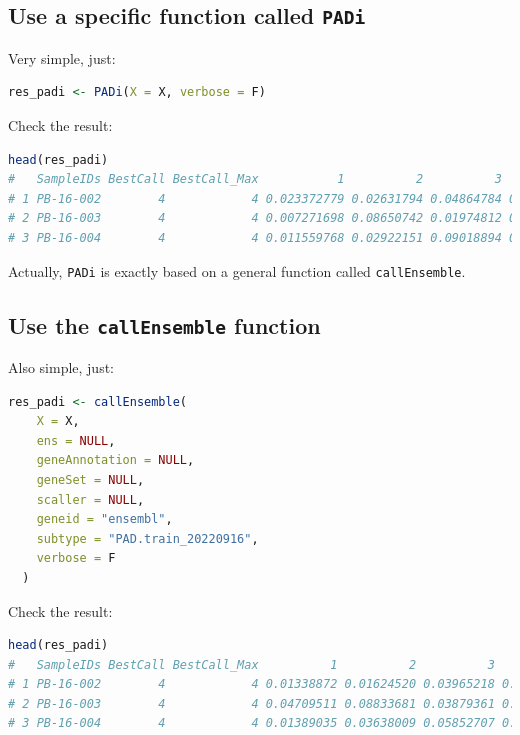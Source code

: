 \documentclass[
  12pt,
]{book}
\newcommand{\passthrough}[1]{#1}
\begin{document}
\hypertarget{use-a-specific-function-called-padi}{%
\subsection{\texorpdfstring{Use a specific function called \texttt{PADi}}{Use a specific function called PADi}}\label{use-a-specific-function-called-padi}}

Very simple, just:

\begin{lstlisting}[language=R]
res_padi <- PADi(X = X, verbose = F)
\end{lstlisting}

Check the result:

\begin{lstlisting}[language=R]
head(res_padi)
#   SampleIDs BestCall BestCall_Max           1          2          3         4
# 1 PB-16-002        4            4 0.023372779 0.02631794 0.04864784 0.3336484
# 2 PB-16-003        4            4 0.007271698 0.08650742 0.01974812 0.9530730
# 3 PB-16-004        4            4 0.011559768 0.02922151 0.09018894 0.8649045
\end{lstlisting}

Actually, \passthrough{\lstinline!PADi!} is exactly based on a general function called \passthrough{\lstinline!callEnsemble!}.

\hypertarget{use-the-callensemble-function}{%
\subsection{\texorpdfstring{Use the \texttt{callEnsemble} function}{Use the callEnsemble function}}\label{use-the-callensemble-function}}

Also simple, just:

\begin{lstlisting}[language=R]
res_padi <- callEnsemble(
    X = X,
    ens = NULL,
    geneAnnotation = NULL,
    geneSet = NULL,
    scaller = NULL,
    geneid = "ensembl",
    subtype = "PAD.train_20220916",
    verbose = F
  )
\end{lstlisting}

Check the result:

\begin{lstlisting}[language=R]
head(res_padi)
#   SampleIDs BestCall BestCall_Max          1          2          3         4
# 1 PB-16-002        4            4 0.01338872 0.01624520 0.03965218 0.8052567
# 2 PB-16-003        4            4 0.04709511 0.08833681 0.03879361 0.6244038
# 3 PB-16-004        4            4 0.01389035 0.03638009 0.05852707 0.6980438
\end{lstlisting}
\end{document}
